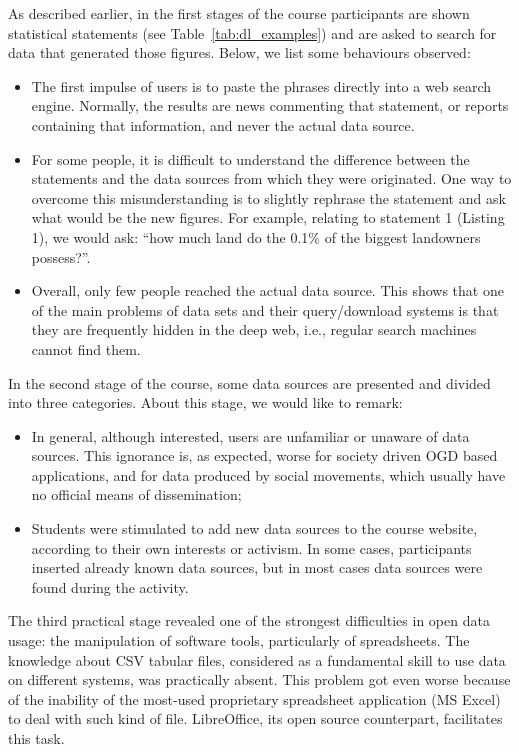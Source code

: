 As described earlier, in the first stages of the course participants are shown statistical statements (see Table~\ref{tab:dl_examples}) and are asked to search for data that generated those figures. Below, we list some behaviours observed:

\begin{itemize}
\item The first impulse of users is to paste the phrases directly into a web search engine. Normally, the results are news commenting that statement, or reports containing that information, and never the actual data source.
\item For some people, it is difficult to understand the difference between the statements and the data sources from which they were originated. One way to overcome this misunderstanding is to slightly rephrase the statement and ask what would be the new figures. For example, relating to statement 1 (Listing 1), we would ask: “how much land do the 0.1\% of the biggest landowners possess?”.
\item Overall, only few people reached the actual data source. This shows that one of the main problems of data sets and their query/download systems is that they are frequently hidden in the deep web, i.e., regular search machines cannot find them.
\end{itemize}

In the second stage of the course, some data sources are presented and divided into three categories. About this stage, we would like to remark:

\begin{itemize}
\item In general, although interested, users are unfamiliar or unaware of data sources. This ignorance is, as expected, worse for society driven OGD based applications, and for data produced by social movements, which usually have no official means of dissemination;
\item Students were stimulated to add new data sources to the course website, according to their own interests or activism. In some cases, participants inserted already known data sources, but in most cases data sources were found during the activity.
\end{itemize}

The third practical stage revealed one of the strongest difficulties in open data usage: the manipulation of software tools, particularly of spreadsheets. The knowledge about CSV tabular files, considered as a fundamental skill to use data on different systems, was practically absent. This problem got even worse because of the inability of the most-used proprietary spreadsheet application (MS Excel) to deal with such kind of file. LibreOffice, its open source counterpart, facilitates this task.


